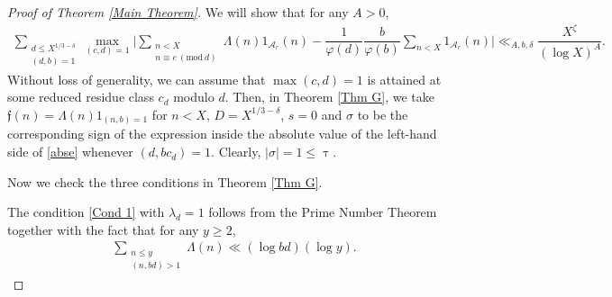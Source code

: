\documentclass[12pt]{amsart}
\numberwithin{equation}{section}
\theoremstyle{remark}
\theoremstyle{definition}
\newcommand{\imod}[1]{\ (\mathrm{mod}\ #1)}
\begin{document}
\begin{proof}[Proof of Theorem \ref{Main Theorem}] We will show that for any $A>0$, 
\begin{align}
\label{abse} \sum_{\substack{d\leq X^{1/3-\delta} \\(d, b)=1}}\max_{(c, d)=1}\bigg|\sum_{\substack{n<X\\n\equiv c\imod d}}\Lambda(n)1_{\mathcal{A}_r}(n)-\dfrac{1}{\varphi(d)}\dfrac{b}{\varphi(b)}\sum_{n<X}1_{\mathcal{A}_r}(n)\bigg| \ll_{A, b, \delta} \dfrac{X^\zeta}{(\log X)^A}.
\end{align}
Without loss of generality, we can assume that $\max{(c, d)=1}$ is attained at some reduced residue class $c_d$ modulo $d$. Then,  in Theorem \ref{Thm G}, we take $\mathfrak{f}(n)=\Lambda(n)1_{(n, b)=1}$ for $n<X$, $D=X^{1/3-\delta}$, $s=0$ and ${\sigma}$ to be the corresponding sign of the expression inside the absolute value of the left-hand side of \eqref{abse} whenever $(d, bc_d)=1$. Clearly, $|{\sigma}|=1\leq \uptau$. 

Now we check the three conditions in Theorem \ref{Thm G}.

 The condition \ref{Cond 1} with $\lambda_d=1$ follows from the Prime Number Theorem \cite[Chapter 18]{dav} together with the fact that for any $y\geq 2$,
\begin{align}\label{thm1 eq1}
\sum_{\substack{n\leq y\\ (n, bd)>1}}\Lambda(n) \ll (\log bd)(\log y).
\end{align}




\end{proof}
\end{document}
